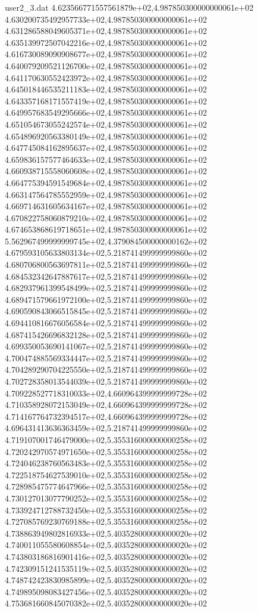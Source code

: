 \begin{filecontents}{user2_3.dat}
4.623566771557561879e+02,4.987850300000000061e+02
4.630200735492957733e+02,4.987850300000000061e+02
4.631286588049605371e+02,4.987850300000000061e+02
4.635139972507042216e+02,4.987850300000000061e+02
4.616730089090908677e+02,4.987850300000000061e+02
4.640079209521126700e+02,4.987850300000000061e+02
4.641170630552423972e+02,4.987850300000000061e+02
4.645018446535211183e+02,4.987850300000000061e+02
4.643357168171557419e+02,4.987850300000000061e+02
4.649957683549295666e+02,4.987850300000000061e+02
4.651054673055242574e+02,4.987850300000000061e+02
4.654896920563380149e+02,4.987850300000000061e+02
4.647745084162895637e+02,4.987850300000000061e+02
4.659836157577464633e+02,4.987850300000000061e+02
4.660938715558060608e+02,4.987850300000000061e+02
4.664775394591549684e+02,4.987850300000000061e+02
4.663147564785552959e+02,4.987850300000000061e+02
4.669714631605634167e+02,4.987850300000000061e+02
4.670822758060879210e+02,4.987850300000000061e+02
4.674653868619718651e+02,4.987850300000000061e+02
5.562967499999999745e+02,4.379084500000000162e+02
4.679593105633803134e+02,5.218741499999999860e+02
4.680706800563697811e+02,5.218741499999999860e+02
4.684532342647887617e+02,5.218741499999999860e+02
4.682937961399548499e+02,5.218741499999999860e+02
4.689471579661972100e+02,5.218741499999999860e+02
4.690590843066515845e+02,5.218741499999999860e+02
4.694410816676056584e+02,5.218741499999999860e+02
4.687415426696832128e+02,5.218741499999999860e+02
4.699350053690141067e+02,5.218741499999999860e+02
4.700474885569334447e+02,5.218741499999999860e+02
4.704289290704225550e+02,5.218741499999999860e+02
4.702728358013544039e+02,5.218741499999999860e+02
4.709228527718310033e+02,4.660964399999999728e+02
4.710358928072153049e+02,4.660964399999999728e+02
4.714167764732394517e+02,4.660964399999999728e+02
4.696431413636363459e+02,5.218741499999999860e+02
4.719107001746479000e+02,5.355316000000000258e+02
4.720242970574971650e+02,5.355316000000000258e+02
4.724046238760563483e+02,5.355316000000000258e+02
4.722518754627539010e+02,5.355316000000000258e+02
4.728985475774647966e+02,5.355316000000000258e+02
4.730127013077790252e+02,5.355316000000000258e+02
4.733924712788732450e+02,5.355316000000000258e+02
4.727085769230769188e+02,5.355316000000000258e+02
4.738863949802816933e+02,5.403528000000000020e+02
4.740011055580608854e+02,5.403528000000000020e+02
4.743803186816901416e+02,5.403528000000000020e+02
4.742309151241535119e+02,5.403528000000000020e+02
4.748742423830985899e+02,5.403528000000000020e+02
4.749895098083427456e+02,5.403528000000000020e+02
4.753681660845070382e+02,5.403528000000000020e+02

\end{filecontents}
